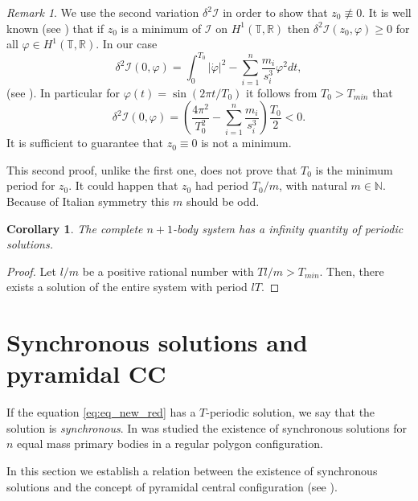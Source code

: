 \documentclass[twoside]{article}
\newtheorem{cor}[thm]{Corollary}
\theoremstyle{remark}
\newtheorem{comentario}{Remark}
\newcommand{\rr}{\mathbb{R}}
\begin{document}
\begin{comentario}
We use the second variation $\delta^2 \mathcal{I}$ in order to show  that $z_0\nequiv 0$. It is well known (see \cite[Th. 1.3.1]{jost1998calculus}) that if $z_0$ is a minimum of $\mathcal{I}$ on $H^1(\mathbb{T},\rr)$  then $\delta^2 \mathcal{I} (z_0,\varphi)\geq 0$ for all $\varphi\in H^1(\mathbb{T},\rr)$. In our case
\[\delta^2\mathcal{I}(0,\varphi)=\int_0^{T_0} |\dot{\varphi}|^2-\sum_{i=1}^{n}\frac{m_i}{s_i^3}\varphi^2 dt,\]
(see \cite[Eq. 1.3.6]{jost1998calculus}). In particular for $\varphi(t)=\sin (2\pi t/T_0)$ it follows from $T_0>T_{min}$  that
\begin{equation}\label{eq:form.delta2}
 \delta^2 \mathcal{I} (0,\varphi)=\left( \frac{4\pi^2}{T_0^2}-\sum_{i=1}^{n}\frac{m_i}{s_i^3} \right)\frac{T_0}{2}<0.
\end{equation}
It is sufficient  to guarantee that $z_0\equiv 0$ is not a minimum.


This second proof, unlike the first one, does not prove that $T_0$ is the minimum period for $z_0$. It could happen that $z_0$ had period $T_0/m$, with natural $m\in\mathbb{N}$. Because of Italian symmetry this $m$ should be odd.
\end{comentario}






\begin{cor}\label{cor:sol.periodica.sist.completo}
The complete $n+1$-body system has a infinity quantity of periodic solutions.
\end{cor}
\begin{proof}
Let $l/m$  be a positive rational number with $Tl/m>T_{min}$. Then, there exists a solution of the entire system with period $lT$.
\end{proof}





\section{Synchronous solutions and pyramidal CC}\label{sec:sincro}



If the equation \eqref{eq:eq_new_red} has a $T$-periodic solution,  we say that the solution is \emph{synchronous}. In \cite{li2013characterization} was studied the existence of synchronous solutions for $n$ equal mass primary bodies in a regular polygon configuration.

In this section we establish a relation between the existence of synchronous solutions and the concept of pyramidal central configuration (see \cite{fayccal1996classification,faycaltesis,ouyang2004pyramidal}).
\end{document}
